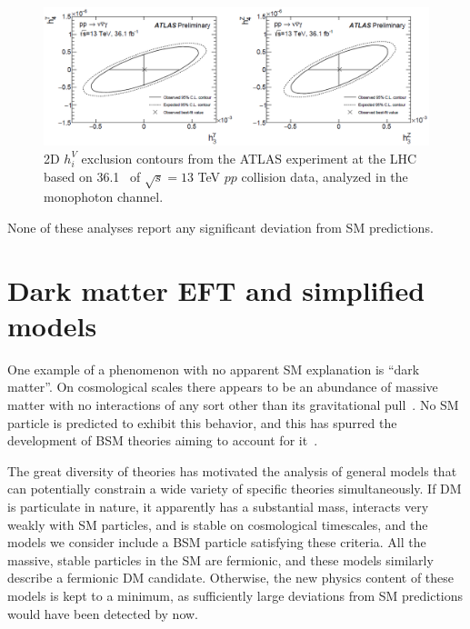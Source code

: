 \documentclass[oneside, letterpaper, 12pt, oldfontcommands]{memoir}
\begin{document}
\begin{figure}[hbtp]
  \begin{center}
    \includegraphics[width=\textwidth]{Figures/atlas_atgc_13tev_2dlimits.png}
    \caption{
      2D $h_{i}^{V}$ exclusion contours from the ATLAS experiment at the LHC based on 36.1 \fbinv\ of $\sqrt{s} = 13$ TeV
      $pp$ collision data, analyzed in the monophoton channel.~\cite{ref:ATLAS-CONF-2018-035}
    }
    \label{fig:atlas_atgc_13tev_2dlimits}
  \end{center}
\end{figure}

None of these analyses report any significant deviation from SM predictions.

\section{Dark matter EFT and simplified models} \label{sec:introduction_dm}
One example of a phenomenon with no apparent SM explanation is ``dark matter''. On cosmological scales there appears to be an abundance of massive
matter with no interactions of any sort other than its gravitational pull~\cite{ref:s41550-017-0059}.
No SM particle is predicted to exhibit this behavior, and this has spurred the development of BSM theories aiming to account for it~\cite{ref:j.physrep.2004.08.031, ref:annurev.nucl.54.070103.181244, ref:S1062798717000783}.

The great diversity of theories has motivated the analysis of general models that can potentially constrain a wide variety of specific theories simultaneously.
If DM is particulate in nature, it apparently has a substantial mass, interacts very weakly with SM particles, and is stable on cosmological timescales,
and the models we consider include a BSM particle satisfying these criteria.
All the massive, stable particles in the SM are fermionic, and these models similarly describe a fermionic DM candidate. Otherwise, the new physics
content of these models is kept to a minimum, as sufficiently large deviations from SM predictions would have been detected by now.
\end{document}
